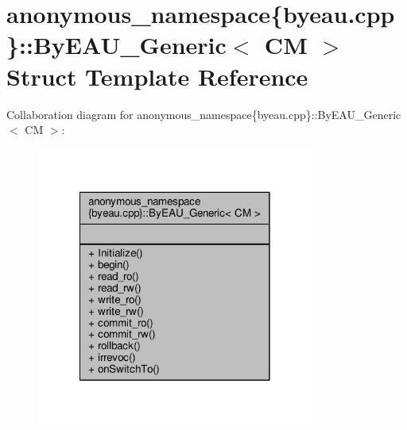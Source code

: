 \hypertarget{structanonymous__namespace_02byeau_8cpp_03_1_1ByEAU__Generic}{\section{anonymous\-\_\-namespace\{byeau.\-cpp\}\-:\-:By\-E\-A\-U\-\_\-\-Generic$<$ C\-M $>$ Struct Template Reference}
\label{structanonymous__namespace_02byeau_8cpp_03_1_1ByEAU__Generic}
}


Collaboration diagram for anonymous\-\_\-namespace\{byeau.\-cpp\}\-:\-:By\-E\-A\-U\-\_\-\-Generic$<$ C\-M $>$\-:
\nopagebreak
\begin{figure}[H]
\begin{center}
\leavevmode
\includegraphics[width=258pt]{structanonymous__namespace_02byeau_8cpp_03_1_1ByEAU__Generic__coll__graph}
\end{center}
\end{figure}
